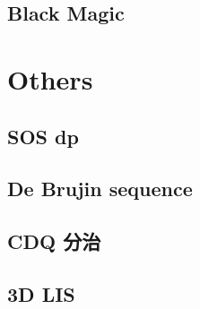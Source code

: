 \documentclass[a4paper,10pt,twocolumn,oneside]{article}
\begin{document}
\subsection{Black Magic}


\section{Others}

\subsection{SOS dp}


%

%

%

%

\subsection{De Brujin sequence}


\subsection{CDQ 分治}


\subsection{3D LIS}

\end{document}

